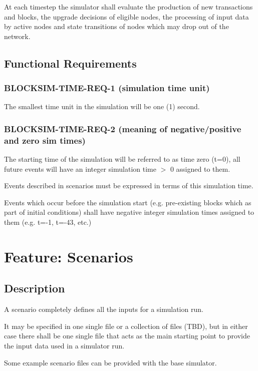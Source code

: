 \documentclass{scrreprt}
\begin{document}
At each timestep the simulator shall evaluate the production of new
transactions and blocks, the upgrade decisions of eligible nodes,
the processing of input data by active nodes and state transitions
of nodes which may drop out of the network.


\subsection{Functional Requirements}


\subsubsection{BLOCKSIM-TIME-REQ-1 (simulation time unit)}

The smallest time unit in the simulation will be one (1) second.

\subsubsection{BLOCKSIM-TIME-REQ-2 (meaning of negative/positive and zero sim times)}

The starting time of the simulation will be referred to as time zero
(t=0), all future events will have an integer simulation time $>$ 0
assigned to them.

Events described in scenarios must be expressed in terms of this
simulation time.

Events which occur before the simulation start (e.g. pre-existing blocks
which as part of initial conditions) shall have negative integer simulation
times assigned to them (e.g. t=-1, t=-43, etc.)



\section{Feature: Scenarios}

\subsection{Description}

A scenario completely defines all the inputs for a simulation run.

It may be specified in one single file or a collection of files (TBD),
but in either case there shall be one single file that acts as the
main starting point to provide the input data used in a simulator run.

Some example scenario files can be provided with the base simulator.
\end{document}
